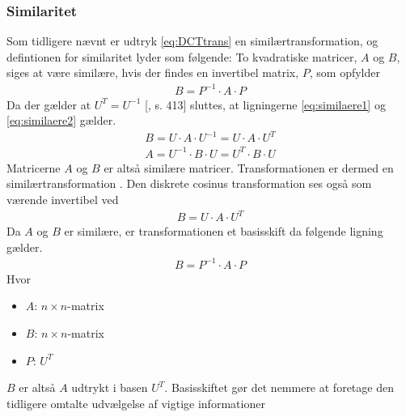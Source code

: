 \subsubsection*{Similaritet}\label{sec:similaritet}
Som tidligere nævnt er udtryk \ref{eq:DCTtrans} en similærtransformation, og defintionen for similaritet lyder som følgende: To kvadratiske matricer, $A$ og $B$, siges at være similære, hvis der findes en invertibel matrix, $P$, som opfylder
\begin{align}
B=P^{-1} \cdot A \cdot P
\end{align}
Da der gælder at $U^T=U^{-1}$ [\citet{linalg}, s. 413] sluttes, at ligningerne \ref{eq:similaere1} og \ref{eq:similaere2} gælder.
\begin{align}
B = U \cdot A \cdot U^{-1} = U \cdot A \cdot U^T
\label{eq:similaere1}
\end{align}
\begin{align}
A = U^{-1} \cdot B \cdot U = U^T \cdot B \cdot U
\label{eq:similaere2}
\end{align}
Matricerne $A$ og $B$ er altså similære matricer. Transformationen er dermed en similærtransformation \citep{similar_wolfram}. Den diskrete cosinus transformation ses også som værende invertibel ved
\begin{align}
B=U \cdot A \cdot U^T
\end{align}
Da $A$ og $B$ er similære, er transformationen et basisskift da følgende ligning gælder.
\begin{align}
B=P^{-1} \cdot A \cdot P
\end{align}
Hvor
\begin{itemize}
	\item{$A$: $n \times n$-matrix}
	\item{$B$: $n \times n$-matrix}
	\item{$P$: $U^T$}
\end{itemize}
$B$ er altså $A$ udtrykt i basen $U^T$. Basisskiftet gør det nemmere at foretage den tidligere omtalte udvælgelse af vigtige informationer

